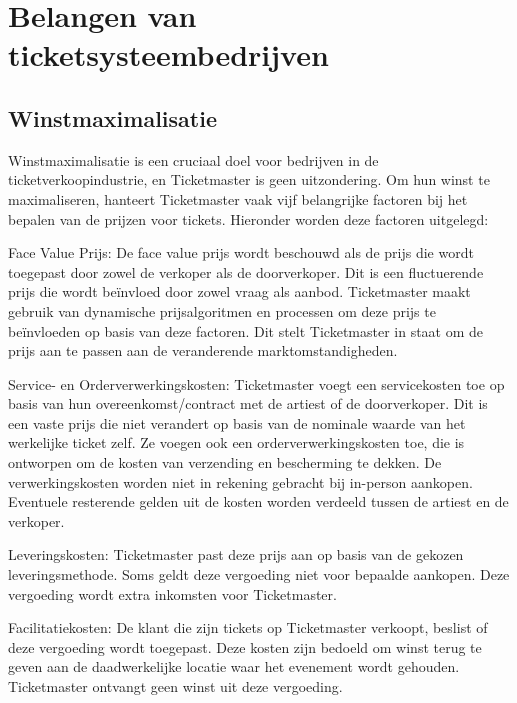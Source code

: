 
\section{Belangen van ticketsysteembedrijven}

\subsection{Winstmaximalisatie}
Winstmaximalisatie is een cruciaal doel voor bedrijven in de ticketverkoopindustrie, en Ticketmaster is geen uitzondering. Om hun winst te maximaliseren, hanteert Ticketmaster vaak vijf belangrijke factoren bij het bepalen van de prijzen voor tickets. Hieronder worden deze factoren uitgelegd:

\vspace{5 mm}

Face Value Prijs: De face value prijs wordt beschouwd als de prijs die wordt toegepast door zowel de verkoper als de doorverkoper. Dit is een fluctuerende prijs die wordt beïnvloed door zowel vraag als aanbod. Ticketmaster maakt gebruik van dynamische prijsalgoritmen en processen om deze prijs te beïnvloeden op basis van deze factoren. Dit stelt Ticketmaster in staat om de prijs aan te passen aan de veranderende marktomstandigheden.

Service- en Orderverwerkingskosten: Ticketmaster voegt een servicekosten toe op basis van hun overeenkomst/contract met de artiest of de doorverkoper. Dit is een vaste prijs die niet verandert op basis van de nominale waarde van het werkelijke ticket zelf. Ze voegen ook een orderverwerkingskosten toe, die is ontworpen om de kosten van verzending en bescherming te dekken. De verwerkingskosten worden niet in rekening gebracht bij in-person aankopen. Eventuele resterende gelden uit de kosten worden verdeeld tussen de artiest en de verkoper.

Leveringskosten: Ticketmaster past deze prijs aan op basis van de gekozen leveringsmethode. Soms geldt deze vergoeding niet voor bepaalde aankopen. Deze vergoeding wordt extra inkomsten voor Ticketmaster.

Facilitatiekosten: De klant die zijn tickets op Ticketmaster verkoopt, beslist of deze vergoeding wordt toegepast. Deze kosten zijn bedoeld om winst terug te geven aan de daadwerkelijke locatie waar het evenement wordt gehouden. Ticketmaster ontvangt geen winst uit deze vergoeding.


